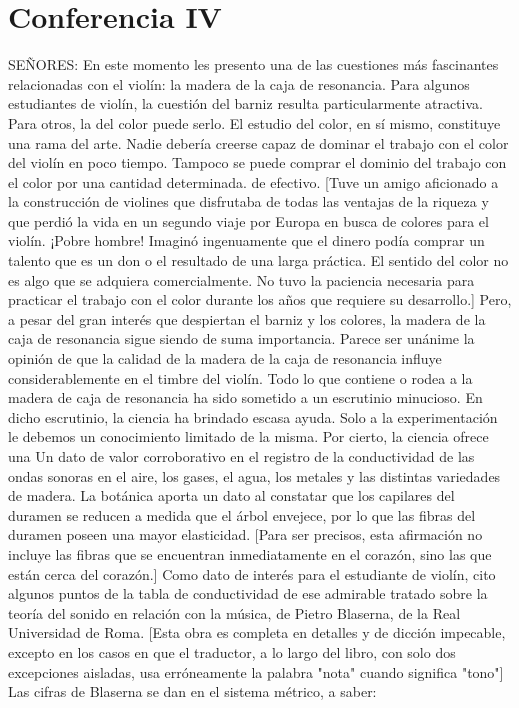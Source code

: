 \chapter*{Conferencia IV}
SEÑORES: En este momento les presento una de las cuestiones más fascinantes relacionadas con el violín: la madera de la caja de resonancia. Para algunos estudiantes de violín, la cuestión del barniz resulta particularmente atractiva. Para otros, la del color puede serlo. El estudio del color, en sí mismo, constituye una rama del arte. Nadie debería creerse capaz de dominar el trabajo con el color del violín en poco tiempo. Tampoco se puede comprar el dominio del trabajo con el color por una cantidad determinada.
de efectivo.
[Tuve un amigo aficionado a la construcción de violines que disfrutaba de todas las ventajas de la riqueza y que perdió la vida en un segundo viaje por Europa en busca de colores para el violín. ¡Pobre hombre! Imaginó ingenuamente que el dinero podía comprar un talento que es un don o el resultado de una larga práctica. El sentido del color no es algo que se adquiera comercialmente. No tuvo la paciencia necesaria para practicar el trabajo con el color durante los años que requiere su desarrollo.]
Pero, a pesar del gran interés que despiertan el barniz y los colores, la madera de la caja de resonancia sigue siendo de suma importancia. Parece ser unánime la opinión de que la calidad de la madera de la caja de resonancia influye considerablemente en el timbre del violín.
Todo lo que contiene o rodea a la madera de caja de resonancia ha sido sometido a un escrutinio minucioso. En dicho escrutinio, la ciencia ha brindado escasa ayuda. Solo a la experimentación le debemos un conocimiento limitado de la misma. Por cierto, la ciencia ofrece una
Un dato de valor corroborativo en el registro de la conductividad de las ondas sonoras en el aire, los gases, el agua, los metales y las distintas variedades de madera. La botánica aporta un dato al constatar que los capilares del duramen se reducen a medida que el árbol envejece, por lo que las fibras del duramen poseen una mayor elasticidad.
[Para ser precisos, esta afirmación no incluye las fibras que se encuentran inmediatamente en el corazón, sino las que están cerca del corazón.]
Como dato de interés para el estudiante de violín, cito algunos puntos de la tabla de conductividad de ese admirable tratado sobre la teoría del sonido en relación con la música, de Pietro Blaserna, de la Real Universidad de Roma.
[Esta obra es completa en detalles y de dicción impecable, excepto en los casos en que el traductor, a lo largo del libro, con solo dos excepciones aisladas, usa erróneamente la palabra "nota" cuando significa
"tono"] Las cifras de Blaserna se dan en el sistema métrico, a saber: 

